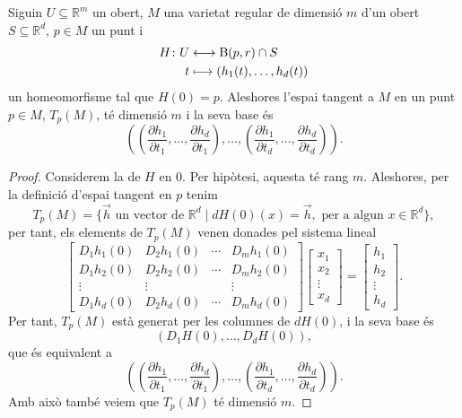 \documentclass[../Apunts.tex]{subfiles}
\begin{document}
	\begin{proposition}
		Siguin \(U\subseteq\mathbb{R}^{m}\) un obert, \(M\) una varietat regular de dimensió \(m\) d'un obert \(S\subseteq\mathbb{R}^{d}\), \(p\in M\) un punt i 
		\begin{align*}
		H\colon U&\longleftrightarrow\operatorname{B}(p,r)\cap S\\
		t&\longmapsto(h_{1}(t),\dots,h_{d}(t))
		\end{align*}
		un homeomorfisme tal que \(H(0)=p\). Aleshores l'espai tangent a \(M\) en un punt \(p\in M\), \(T_{p}(M)\), té dimensió \(m\) i la seva base és
		\[\left(\left(\frac{\partial h_{1}}{\partial t_{1}},\dots,\frac{\partial h_{d}}{\partial t_{1}}\right),\dots,\left(\frac{\partial h_{1}}{\partial t_{d}},\dots,\frac{\partial h_{d}}{\partial t_{d}}\right)\right).\] %
		\begin{proof}
			Considerem la  de \(H\) en \(0\). Per hipòtesi, aquesta té rang \(m\). Aleshores, per la definició d'espai tangent en \(p\) tenim
			\[T_{p}(M)=\{\vec{h}\text{ un vector de }\mathbb{R}^{d}\mid dH(0)(x)=\vec{h},\text{ per a algun }x\in\mathbb{R}^{d}\},\]
			per tant, els elements de \(T_{p}(M)\) venen donades pel sistema lineal
			\[\left[\begin{matrix}
			D_{1}h_{1}(0) & D_{2}h_{1}(0) & \cdots & D_{m}h_{1}(0)\\
			D_{1}h_{2}(0) & D_{2}h_{2}(0) & \cdots & D_{m}h_{2}(0)\\
			\vdots & \vdots && \vdots \\
			D_{1}h_{d}(0) & D_{2}h_{d}(0) & \cdots & D_{m}h_{d}(0)
			\end{matrix}\right]
			\left[\begin{matrix}
			x_{1}\\ x_{2}\\ \vdots\\ x_{d}
			\end{matrix}\right]=
			\left[\begin{matrix}
			h_{1}\\ h_{2}\\ \vdots\\ h_{d}
			\end{matrix}\right].\]
			Per tant, \(T_{p}(M)\) està generat per les columnes de \(dH(0)\), i la seva base és
			\[(D_{1}H(0),\dots,D_{d}H(0)),\]
			que és equivalent a
			\[\left(\left(\frac{\partial h_{1}}{\partial t_{1}},\dots,\frac{\partial h_{d}}{\partial t_{1}}\right),\dots,\left(\frac{\partial h_{1}}{\partial t_{d}},\dots,\frac{\partial h_{d}}{\partial t_{d}}\right)\right).\]
			Amb això també veiem que \(T_{p}(M)\) té dimensió \(m\).
		\end{proof}
	\end{proposition}
\end{document}
